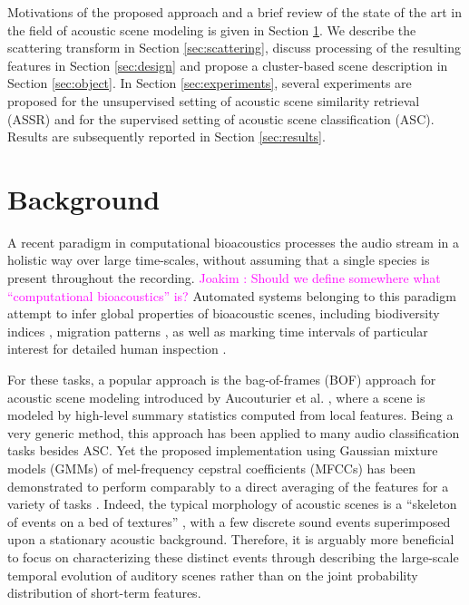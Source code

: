\documentclass[journal]{IEEEtran}
\makeatletter
\newcommand*{\ie}{i.e.\@\xspace}
\newcommand{\ja}[1]{\textcolor{magenta}{Joakim : #1}}
\makeatother
\begin{document}
Motivations of the proposed approach and a brief review of the state of the art in the field of acoustic scene modeling is given in Section \ref{sec:soa}. We describe the scattering transform in Section \ref{sec:scattering}, discuss processing of the resulting features in Section \ref{sec:design} and propose a cluster-based scene description in Section \ref{sec:object}. In Section \ref{sec:experiments}, several experiments are proposed for the unsupervised setting of acoustic scene similarity retrieval (ASSR) and for the supervised setting of acoustic scene classification (ASC). Results are subsequently reported in Section \ref{sec:results}.

\section{Background} \label{sec:soa}


A recent paradigm in computational bioacoustics processes the audio stream in a holistic way over large time-scales, without assuming that a single species is present throughout the recording. \ja{Should we define somewhere what ``computational bioacoustics'' is?} Automated systems belonging to this paradigm attempt to infer global properties of bioacoustic scenes, including biodiversity indices \cite{Bardeli2010}, migration patterns \cite{Obrist2010}, as well as marking time intervals of particular interest for detailed human inspection \cite{rosenstock2002landbird}.

For these tasks, a popular approach is the bag-of-frames (BOF) approach for acoustic scene modeling introduced by Aucouturier et al. \cite{aucouturier2007bag}, where a scene is modeled by high-level summary statistics computed from local features.
Being a very generic method, this approach has been applied to many audio classification tasks besides ASC.
Yet the proposed implementation using Gaussian mixture models (GMMs) of mel-frequency cepstral coefficients (MFCCs) has been demonstrated to perform comparably to a direct averaging of the features for a variety of tasks \cite{lagrange:hal-01082501}.
Indeed, the typical morphology of acoustic scenes is a ``skeleton of events on a bed of textures'' \cite{nelken2013}, with a few discrete sound events superimposed upon a stationary acoustic background.
Therefore, it is arguably more beneficial to focus on characterizing these distinct events through describing the large-scale temporal evolution of auditory scenes rather than on the joint probability distribution of short-term features.
\end{document}
